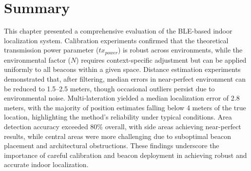 
\section{Summary}

This chapter presented a comprehensive evaluation of the BLE-based indoor localization system. Calibration experiments confirmed that the theoretical transmission power parameter ($tx_{power}$) is robust across environments, while the environmental factor ($N$) requires context-specific adjustment but can be applied uniformly to all beacons within a given space. Distance estimation experiments demonstrated that, after filtering, median errors in near-perfect environment can be reduced to 1.5--2.5 meters, though occasional outliers persist due to environmental noise. Multi-lateration yielded a median localization error of 2.8 meters, with the majority of position estimates falling below 4 meters of the true location, highlighting the method's reliability under typical conditions. Area detection accuracy exceeded 80\% overall, with side areas achieving near-perfect results, while central areas were more challenging due to suboptimal beacon placement and architectural obstructions. These findings underscore the importance of careful calibration and beacon deployment in achieving robust and accurate indoor localization.
